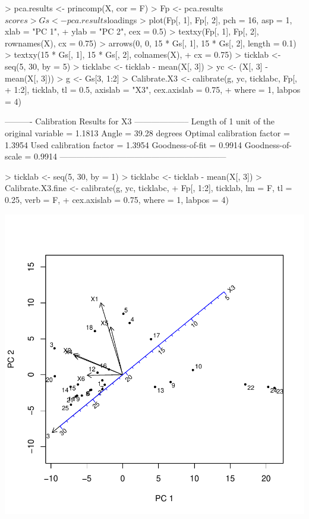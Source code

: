 \documentclass[a4paper]{article}
\begin{document}
\begin{Schunk}
\begin{Sinput}
> pca.results <- princomp(X, cor = F)
> Fp <- pca.results$scores
> Gs <- pca.results$loadings
> plot(Fp[, 1], Fp[, 2], pch = 16, asp = 1, xlab = "PC 1", 
+     ylab = "PC 2", cex = 0.5)
> textxy(Fp[, 1], Fp[, 2], rownames(X), cx = 0.75)
> arrows(0, 0, 15 * Gs[, 1], 15 * Gs[, 2], length = 0.1)
> textxy(15 * Gs[, 1], 15 * Gs[, 2], colnames(X), 
+     cx = 0.75)
> ticklab <- seq(5, 30, by = 5)
> ticklabc <- ticklab - mean(X[, 3])
> yc <- (X[, 3] - mean(X[, 3]))
> g <- Gs[3, 1:2]
> Calibrate.X3 <- calibrate(g, yc, ticklabc, Fp[, 
+     1:2], ticklab, tl = 0.5, axislab = "X3", cex.axislab = 0.75, 
+     where = 1, labpos = 4)
\end{Sinput}
\begin{Soutput}
---------- Calibration Results for  X3  --------------------
Length of 1 unit of the original variable =  1.1813  
Angle                                     =  39.28 degrees
Optimal calibration factor                =  1.3954  
Used calibration factor                   =  1.3954  
Goodness-of-fit                           =  0.9914  
Goodness-of-scale                         =  0.9914  
------------------------------------------------------------
\end{Soutput}
\begin{Sinput}
> ticklab <- seq(5, 30, by = 1)
> ticklabc <- ticklab - mean(X[, 3])
> Calibrate.X3.fine <- calibrate(g, yc, ticklabc, 
+     Fp[, 1:2], ticklab, lm = F, tl = 0.25, verb = F, 
+     cex.axislab = 0.75, where = 1, labpos = 4)
\end{Sinput}
\end{Schunk}
\includegraphics{CalibrationGuide-010}
\end{document}
